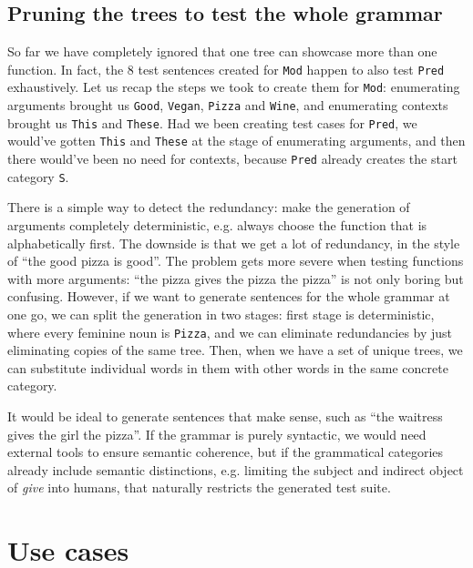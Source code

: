 \documentclass[11pt]{article}
\def\t#1{\texttt{#1}}
\begin{document}
\subsection{Pruning the trees to test the whole grammar}
\label{sec:pruning_all}
So far we have completely ignored that one tree can showcase more
than one function. In fact, the 8 test sentences created for \t{Mod}
happen to also test \t{Pred} exhaustively.
Let us recap the steps we took to create them for \t{Mod}:
enumerating arguments brought us \t{Good}, \t{Vegan}, \t{Pizza} and
\t{Wine}, and enumerating contexts brought us \t{This} and
\t{These}. Had we been creating test cases for \t{Pred}, we would've
gotten \t{This} and \t{These} at the stage of enumerating arguments,
and then there would've been no need for contexts, because \t{Pred}
already creates the start category \t{S}.

There is a simple way to detect the redundancy: make the generation of
arguments completely deterministic, e.g. always choose the function
that is alphabetically first. The downside is that we get a lot of
redundancy, in the style of ``the good pizza is good''. The problem
gets more severe when testing functions with more arguments: ``the
pizza gives the pizza the pizza'' is not only boring but confusing.
However, if we want to generate sentences for the whole grammar at one 
go, we can split the generation in two stages: first stage is
deterministic, where every feminine noun is \t{Pizza}, and we can 
eliminate redundancies by just eliminating copies of the same
tree. Then, when we have a set of unique trees, we can substitute
individual words in them with other words in the same concrete
category.

It would be ideal to generate sentences that make sense,
such as ``the waitress gives the girl the pizza''. If the grammar is
purely syntactic, we would need external tools to ensure semantic
coherence, but if the grammatical categories already include semantic
distinctions, e.g. limiting the subject and indirect object of
\emph{give} into humans, that naturally restricts the generated test suite.

\section{Use cases}
\end{document}
